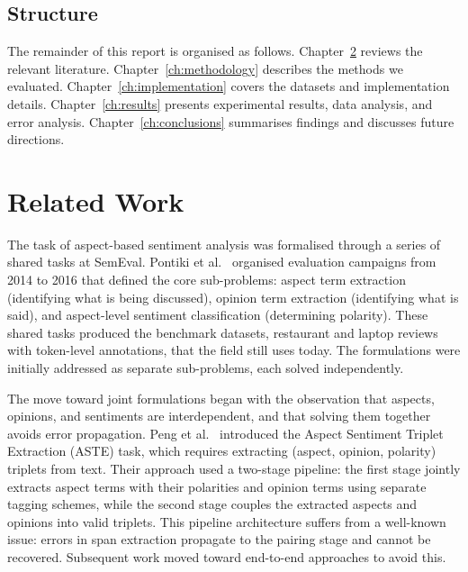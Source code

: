 \documentclass[12pt,a4paper]{report}
\begin{document}
\section{Structure}

The remainder of this report is organised as follows. Chapter~\ref{ch:relatedwork} reviews the relevant literature. Chapter~\ref{ch:methodology} describes the methods we evaluated. Chapter~\ref{ch:implementation} covers the datasets and implementation details. Chapter~\ref{ch:results} presents experimental results, data analysis, and error analysis. Chapter~\ref{ch:conclusions} summarises findings and discusses future directions.



\chapter{Related Work}\label{ch:relatedwork}

The task of aspect-based sentiment analysis was formalised through a series of shared tasks at SemEval. Pontiki et al.~\cite{pontiki2014semeval, pontiki2015semeval, pontiki2016semeval} organised evaluation campaigns from 2014 to 2016 that defined the core sub-problems: aspect term extraction (identifying what is being discussed), opinion term extraction (identifying what is said), and aspect-level sentiment classification (determining polarity). These shared tasks produced the benchmark datasets, restaurant and laptop reviews with token-level annotations, that the field still uses today. The formulations were initially addressed as separate sub-problems, each solved independently.

The move toward joint formulations began with the observation that aspects, opinions, and sentiments are interdependent, and that solving them together avoids error propagation. Peng et al.~\cite{peng2020knowing} introduced the Aspect Sentiment Triplet Extraction (ASTE) task, which requires extracting (aspect, opinion, polarity) triplets from text. Their approach used a two-stage pipeline: the first stage jointly extracts aspect terms with their polarities and opinion terms using separate tagging schemes, while the second stage couples the extracted aspects and opinions into valid triplets. This pipeline architecture suffers from a well-known issue: errors in span extraction propagate to the pairing stage and cannot be recovered. Subsequent work moved toward end-to-end approaches to avoid this.
\end{document}

